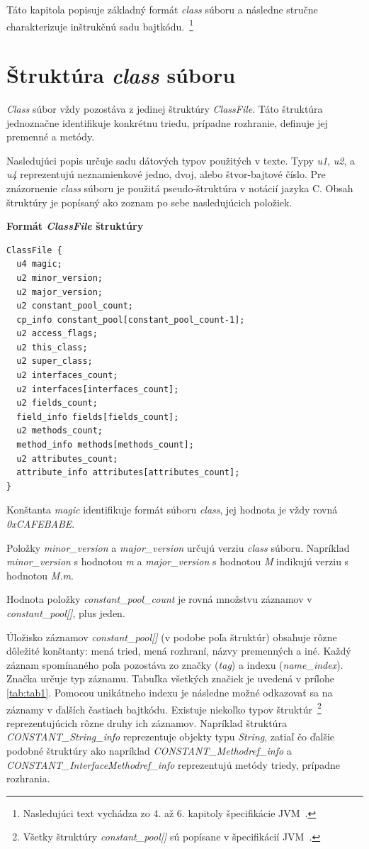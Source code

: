 \documentclass[11pt,final,oneside]{fithesis}
\newenvironment{example}[1]
{
\vspace{3mm}
\noindent\textbf{#1}
\vspace{2mm}
}
{
\vspace{3mm}
}
\begin{document}
Táto kapitola popisuje základný formát \textit{class} súboru a následne stručne
charakterizuje inštrukčnú sadu bajtkódu.~\footnote{Nasledujúci text vychádza 
zo 4. až 6. kapitoly špecifikácie JVM~\cite{Lindholm:2013:JVM:2462629}.}

\section{Štruktúra \textit{class} súboru}
\label{sec:classFile}
\textit{Class} súbor vždy pozostáva z jedinej štruktúry \textit{ClassFile}.
Táto štruktúra jednoznačne identifikuje konkrétnu triedu, 
prípadne rozhranie, definuje jej premenné a metódy.

Nasledujúci popis určuje sadu dátových typov použitých v texte. Typy
\textit{u1}, \textit{u2}, a \textit{u4} reprezentujú neznamienkové jedno, 
dvoj, alebo štvor-bajtové číslo. Pre znázornenie \textit{class} súboru je 
použitá pseudo-štruktúra v notácií jazyka C. Obsah štruktúry je popísaný ako 
zoznam po sebe nasledujúcich položiek.

\begin{example}{Formát \textit{ClassFile} štruktúry}
\begin{verbatim}
ClassFile {
  u4 magic;
  u2 minor_version;
  u2 major_version;
  u2 constant_pool_count;
  cp_info constant_pool[constant_pool_count-1];
  u2 access_flags;
  u2 this_class;
  u2 super_class;
  u2 interfaces_count;
  u2 interfaces[interfaces_count];
  u2 fields_count;
  field_info fields[fields_count];
  u2 methods_count;
  method_info methods[methods_count];
  u2 attributes_count;
  attribute_info attributes[attributes_count];
}
\end{verbatim}
\end{example}

Konštanta \textit{magic} identifikuje formát súboru \textit{class},
jej hodnota je vždy rovná \textit{0xCAFEBABE}.

Položky \textit{minor\_version} a \textit{major\_version}
určujú verziu \textit{class} súboru. Napríklad \textit{minor\_version} s
hodnotou \textit{m} a \textit{major\_version} s hodnotou \textit{M} indikujú
verziu s hodnotou \textit{M.m}.

Hodnota položky \textit{constant\_pool\_count} je rovná množstvu záznamov
v \textit{constant\_pool[]}, plus jeden.

Úložisko záznamov \textit{constant\_pool[]} (v podobe poľa štruktúr)
obsahuje rôzne dôležité konštanty: mená tried,  mená rozhraní, názvy 
premenných a iné. Každý záznam spomínaného poľa pozostáva zo značky
(\textit{tag}) a indexu (\textit{name\_index}). Značka určuje typ záznamu. 
Tabuľka všetkých značiek je uvedená v prílohe \ref{tab:tab1}. Pomocou 
unikátneho indexu je následne možné odkazovať sa na záznamy v ďalších častiach 
bajtkódu. Existuje niekoľko typov štruktúr~\footnote{Všetky štruktúry \textit{
constant\_pool[]} sú popísane v špecifikácií
JVM~\cite{Lindholm:2013:JVM:2462629}.}
reprezentujúcich rôzne druhy ich záznamov. Napríklad štruktúra
\textit{CONSTANT\_String\_info} reprezentuje objekty typu \textit{String}, 
zatiaľ čo ďalšie podobné štruktúry ako napríklad
\textit{CONSTANT\_Methodref\_info} a 
\textit{CONSTANT\_InterfaceMethodref\_info} reprezentujú metódy 
triedy, prípadne rozhrania.
\end{document}
